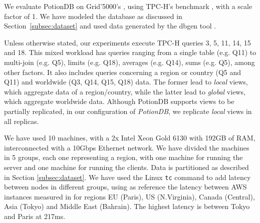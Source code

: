 \documentclass[sigplan,twocolumn,review,anonymous]{acmart}
\begin{document}
We evaluate PotionDB on Grid'5000's \cite{Grid5000}, using TPC-H's benchmark \cite{tpch}, with a scale factor of 1. %
We have modeled the database as discussed in Section~\ref{subsec:dataset} and used data generated by the dbgen tool \cite{tpch}.

Unless otherwise stated, our experiments execute TPC-H queries 3, 5, 11, 14, 15 and 18.
This mixed workload has queries ranging from a single table (e.g. Q11) to multi-join (e.g. Q5), limits (e.g. Q18), averages (e.g. Q14), sums (e.g. Q5), 
among other factors. It also includes queries concerning a region or country (Q5 and Q11) and worldwide (Q3, Q14, Q15, Q18) data.
The former lead to \textit{local} views, which aggregate data of a region/country, while the latter lead to \textit{global} views, which aggregate worldwide data. 
Although PotionDB supports views to be partially replicated, in our configuration of \textit{PotionDB}, we replicate \textit{local} views in all replicas.




We have used 10 machines, with a 2x Intel Xeon Gold 6130 with 192GB of RAM, interconnected with a 10Gbps Ethernet network. 
We have divided the machines in 5 groups,  each one representing a region, with one machine for running the server and one machine for running the clients.  
Data is partitioned as described in Section \ref{subsec:dataset}. 
We have used the Linux \texttt{tc} command to add latency between nodes in different groups, using as reference the latency between AWS instances measured in \cite{AWSLatency} for regions EU (Paris), US (N.Virginia), Canada (Central), Asia (Tokyo) and Middle East (Bahrain). The highest latency is between Tokyo and Paris at 217ms.  
\end{document}
